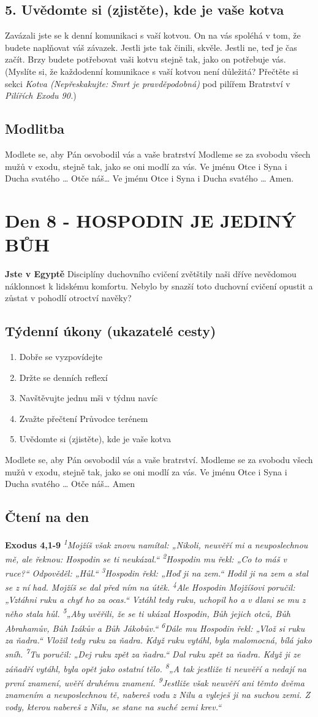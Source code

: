 \documentclass[11pt]{article}
\newcommand{\zacatekDruhyTyden}{
  \textbf{Jste v Egyptě} \newline
  Disciplíny duchovního cvičení zvětštily naši dříve nevědomou náklonnost k lidskému komfortu.
  Nebylo by snazší toto duchovní cvičení opustit a zůstat v pohodlí otroctví navěky?

  \subsection*{Týdenní úkony (ukazatelé cesty)}
\begin{enumerate}
  \item Dobře se vyzpovídejte
  \item Držte se denních reflexí
  \item Navštěvujte jednu mši v týdnu navíc
  \item Zvažte přečtení Průvodce terénem
  \item Uvědomte si (zjistěte), kde je vaše kotva
\end{enumerate}
Modlete se, aby Pán osvobodil vás a vaše bratrství. \newline
Modleme se za svobodu všech mužů v exodu, stejně tak, jako se oni modlí za vás.\newline
Ve jménu Otce i Syna i Ducha svatého …  Otče náš… Amen
}
\begin{document}
\subsection*{5. Uvědomte si (zjistěte), kde je vaše kotva}
Zavázali jste se k denní komunikaci s vaší kotvou. On na vás spoléhá v tom, že budete naplňovat váš závazek. Jestli jste tak činili, skvěle. Jestli ne, teď je čas začít. Brzy budete potřebovat vaši kotvu stejně tak, jako on potřebuje vás. (Myslíte si, že každodenní komunikace s vaší kotvou není důležitá? Přečtěte si sekci \textit{Kotva (Nepřeskakujte: Smrt je pravděpodobná)} pod pilířem Bratrství v \textit{Pilířích Exodu 90.})

\subsection*{Modlitba}
Modlete se, aby Pán osvobodil vás a vaše bratrství \newline
Modleme se za svobodu všech mužů v exodu, stejně tak, jako se oni modlí za vás.\newline
Ve jménu Otce i Syna i Ducha svatého … Otče náš… Ve jménu Otce i Syna i Ducha svatého … Amen.

\newpage
\section{Den 8 - HOSPODIN JE JEDINÝ BŮH}
\zacatekDruhyTyden
\subsection*{Čtení na den}
\textbf{Exodus 4,1-9}
\newline
\textit{
\textsuperscript{1}Mojžíš však znovu namítal: „Nikoli, neuvěří mi a neuposlechnou mě, ale řeknou: Hospodin se ti neukázal.“
\textsuperscript{2}Hospodin mu řekl: „Co to máš v ruce?“ Odpověděl: „Hůl.“
\textsuperscript{3}Hospodin řekl: „Hoď ji na zem.“ Hodil ji na zem a stal se z ní had. Mojžíš se dal před ním na útěk.
\textsuperscript{4}Ale Hospodin Mojžíšovi poručil: „Vztáhni ruku a chyť ho za ocas.“ Vztáhl tedy ruku, uchopil ho a v dlani se mu z něho stala hůl.
\textsuperscript{5}„Aby uvěřili, že se ti ukázal Hospodin, Bůh jejich otců, Bůh Abrahamův, Bůh Izákův a Bůh Jákobův.“
\textsuperscript{6}Dále mu Hospodin řekl: „Vlož si ruku za ňadra.“ Vložil tedy ruku za ňadra. Když ruku vytáhl, byla malomocná, bílá jako sníh.
\textsuperscript{7}Tu poručil: „Dej ruku zpět za ňadra.“ Dal ruku zpět za ňadra. Když ji ze záňadří vytáhl, byla opět jako ostatní tělo.
\textsuperscript{8}„A tak jestliže ti neuvěří a nedají na první znamení, uvěří druhému znamení.
\textsuperscript{9}Jestliže však neuvěří ani těmto dvěma znamením a neuposlechnou tě, nabereš vodu z Nilu a vyleješ ji na suchou zemi. Z vody, kterou nabereš z Nilu, se stane na suché zemi krev.“
}
\end{document}
